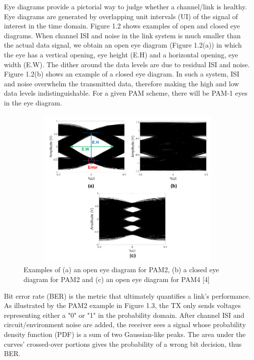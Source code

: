 Eye diagrams provide a pictorial way to judge whether a channel/link is healthy. Eye diagrams are generated by overlapping unit intervals (UI) of the signal of interest in the time domain. Figure 1.2 shows examples of open and closed eye diagrams. When channel ISI and noise in the link system is much smaller than the actual data signal, we obtain an open eye diagram (Figure 1.2(a)) in which the eye has a vertical opening, eye height (E.H) and a horizontal opening, eye width (E.W). The dither around the data levels are due to residual ISI and noise. Figure 1.2(b) shows an example of a closed eye diagram. In such a system, ISI and noise overwhelm the transmitted data, therefore making the high and low data levels indistinguishable. For a given PAM scheme, there will be PAM-1 eyes in the eye diagram. \\

\begin{figure}
	\centering
	\includegraphics[width=12cm,height=8cm]{fig1_2.png}
	\caption{Examples of (a) an open eye diagram for PAM2, (b) a closed eye diagram
for PAM2 and (c) an open eye diagram for PAM4 [4]}
	\label{PAM_eye}
\end{figure}

Bit error rate (BER) is the metric that ultimately quantifies a link's performance. As illustrated by the PAM2 example in Figure 1.3, the TX only sends voltages representing either a "0" or "1" in the probability domain. After channel ISI and circuit/environment noise are added, the receiver sees a signal whose probability density function (PDF) is a sum of two Gaussian-like peaks. The area under the curves' crossed-over portions gives the probability of a wrong bit decision, thus BER.\\

